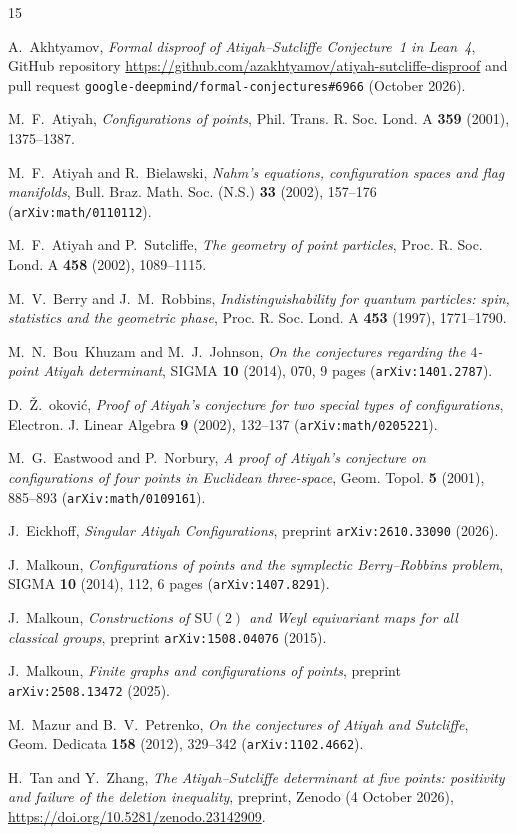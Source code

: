 \documentclass[11pt,reqno]{amsart}
\theoremstyle{remark}
\begin{document}
\begin{thebibliography}{15}

A.~Akhtyamov,
\emph{Formal disproof of Atiyah--Sutcliffe Conjecture~1 in Lean~4},
GitHub repository \url{https://github.com/azakhtyamov/atiyah-sutcliffe-disproof} and pull request \texttt{google-deepmind/formal-conjectures\#6966} (October 2026).

M.~F.~Atiyah,
\emph{Configurations of points},
Phil. Trans. R. Soc. Lond. A \textbf{359} (2001), 1375--1387.

M.~F.~Atiyah and R.~Bielawski,
\emph{Nahm's equations, configuration spaces and flag manifolds},
Bull. Braz. Math. Soc. (N.S.) \textbf{33} (2002), 157--176 (\texttt{arXiv:math/0110112}).

M.~F.~Atiyah and P.~Sutcliffe,
\emph{The geometry of point particles},
Proc. R. Soc. Lond. A \textbf{458} (2002), 1089--1115.

M.~V.~Berry and J.~M.~Robbins,
\emph{Indistinguishability for quantum particles: spin, statistics and the geometric phase},
Proc. R. Soc. Lond. A \textbf{453} (1997), 1771--1790.

M.~N.~Bou~Khuzam and M.~J.~Johnson,
\emph{On the conjectures regarding the $4$-point Atiyah determinant},
SIGMA \textbf{10} (2014), 070, 9 pages (\texttt{arXiv:1401.2787}).

D.~\v{Z}.~\DJ okovi\'c,
\emph{Proof of Atiyah's conjecture for two special types of configurations},
Electron. J. Linear Algebra \textbf{9} (2002), 132--137 (\texttt{arXiv:math/0205221}).

M.~G.~Eastwood and P.~Norbury,
\emph{A proof of Atiyah's conjecture on configurations of four points in Euclidean three-space},
Geom. Topol. \textbf{5} (2001), 885--893 (\texttt{arXiv:math/0109161}).

J.~Eickhoff,
\emph{Singular Atiyah Configurations},
preprint \texttt{arXiv:2610.33090} (2026).

J.~Malkoun,
\emph{Configurations of points and the symplectic Berry--Robbins problem},
SIGMA \textbf{10} (2014), 112, 6 pages (\texttt{arXiv:1407.8291}).

J.~Malkoun,
\emph{Constructions of $\mathrm{SU}(2)$ and Weyl equivariant maps for all classical groups},
preprint \texttt{arXiv:1508.04076} (2015).

J.~Malkoun,
\emph{Finite graphs and configurations of points},
preprint \texttt{arXiv:2508.13472} (2025).

M.~Mazur and B.~V.~Petrenko,
\emph{On the conjectures of Atiyah and Sutcliffe},
Geom. Dedicata \textbf{158} (2012), 329--342 (\texttt{arXiv:1102.4662}).

H.~Tan and Y.~Zhang,
\emph{The Atiyah--Sutcliffe determinant at five points: positivity and failure of the deletion inequality},
preprint, Zenodo (4 October 2026), \url{https://doi.org/10.5281/zenodo.23142909}.

\end{thebibliography}
\end{document}
